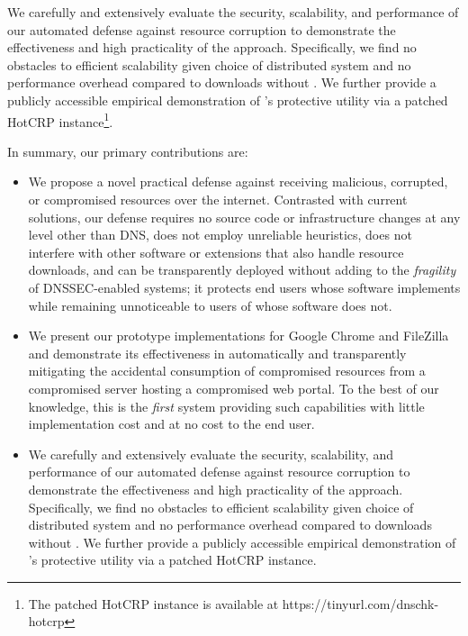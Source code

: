 
We carefully and extensively evaluate the security, scalability, and performance
of our automated defense against resource corruption to demonstrate the
effectiveness and high practicality of the \SYSTEM{} approach. Specifically, we
find no obstacles to efficient scalability given choice of distributed system
and no performance overhead compared to downloads without \SYSTEM{}. We further
provide a publicly accessible empirical demonstration of \SYSTEM{}'s protective
utility via a patched HotCRP instance\footnote{The patched HotCRP instance is
available at https://tinyurl.com/dnschk-hotcrp}.

In summary, our primary contributions are:

\begin{itemize}

  \item We propose a novel practical defense against receiving malicious,
  corrupted, or compromised resources over the internet. Contrasted with current
  solutions, our defense requires no source code or infrastructure changes at
  any level other than DNS, does not employ unreliable heuristics, does not
  interfere with other software or extensions that also handle resource
  downloads, and can be transparently deployed without adding to the
  \textit{fragility} of DNSSEC-enabled systems; it protects end users whose
  software implements \SYSTEM{} while remaining unnoticeable to users of whose
  software does not.

  \item We present our prototype \SYSTEM{} implementations for Google Chrome and
  FileZilla and demonstrate its effectiveness in automatically and transparently
  mitigating the accidental consumption of compromised resources from a
  compromised server hosting a compromised web portal. To the best of our
  knowledge, this is the \emph{first} system providing such capabilities with
  little implementation cost and at no cost to the end user.

  \item We carefully and extensively evaluate the security, scalability, and
  performance of our automated defense against resource corruption to
  demonstrate the effectiveness and high practicality of the \SYSTEM{} approach.
  Specifically, we find no obstacles to efficient scalability given choice of
  distributed system and no performance overhead compared to downloads without
  \SYSTEM{}. We further provide a publicly accessible empirical demonstration of
  \SYSTEM{}'s protective utility via a patched HotCRP instance.

\end{itemize}

